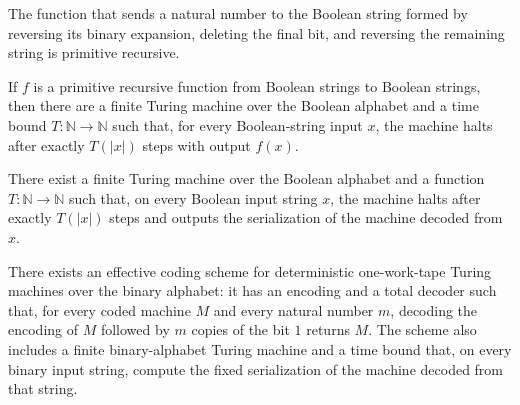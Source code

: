 \begin{lemma}
\label{Turing.bridgePrimUnnumber}
\leanok
{}
The function that sends a natural number to the Boolean string formed by reversing its
binary expansion, deleting the final bit, and reversing the remaining string is
primitive recursive.
\end{lemma}

\begin{lemma}
\label{Turing.codePrim_machine}
\leanok
{}
If $f$ is a primitive recursive function from Boolean strings to Boolean strings, then
there are a finite Turing machine over the Boolean alphabet and a time bound
$T\colon\mathbb{N}\to\mathbb{N}$ such that, for every Boolean-string input $x$, the
machine halts after exactly $T(|x|)$ steps with output $f(x)$.
\end{lemma}

\begin{lemma}
\label{Turing.codeCanonical_machine}
\leanok
{}
There exist a finite Turing machine over the Boolean alphabet and a function
$T\colon\mathbb N\to\mathbb N$ such that, on every Boolean input string $x$, the machine
halts after exactly $T(|x|)$ steps and outputs the serialization of the machine decoded
from $x$.
\end{lemma}

\begin{theorem}
\label{Turing.exists_effectiveMachineCode}
\leanok
{}
There exists an effective coding scheme for deterministic one-work-tape Turing machines
over the binary alphabet: it has an encoding and a total decoder such that, for every
coded machine $M$ and every natural number $m$, decoding the encoding of $M$ followed by
$m$ copies of the bit $1$ returns $M$. The scheme also includes a finite binary-alphabet
Turing machine and a time bound that, on every binary input string, compute the fixed
serialization of the machine decoded from that string.
\end{theorem}

